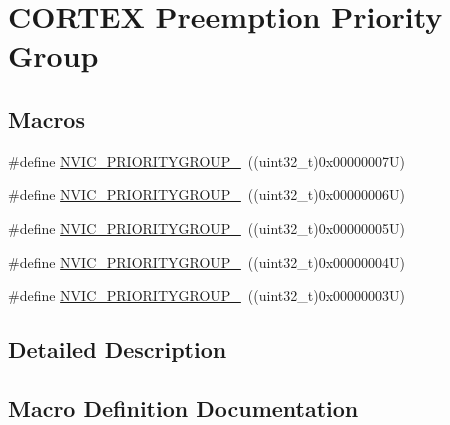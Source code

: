\hypertarget{group___c_o_r_t_e_x___preemption___priority___group}{}\section{C\+O\+R\+T\+EX Preemption Priority Group}
\label{group___c_o_r_t_e_x___preemption___priority___group}
\subsection*{Macros}
\begin{DoxyCompactItemize}
\item 
\#define \mbox{\hyperlink{group___c_o_r_t_e_x___preemption___priority___group_ga5e97dcff77680602c86e44f23f5ffa1a}{N\+V\+I\+C\+\_\+\+P\+R\+I\+O\+R\+I\+T\+Y\+G\+R\+O\+U\+P\+\_}}~((uint32\+\_\+t)0x00000007\+U)
\item 
\#define \mbox{\hyperlink{group___c_o_r_t_e_x___preemption___priority___group_ga702227137b010421c3a3b6434005a132}{N\+V\+I\+C\+\_\+\+P\+R\+I\+O\+R\+I\+T\+Y\+G\+R\+O\+U\+P\+\_}}~((uint32\+\_\+t)0x00000006\+U)
\item 
\#define \mbox{\hyperlink{group___c_o_r_t_e_x___preemption___priority___group_gaa43a3fd37850c120ce567ab2743d11b4}{N\+V\+I\+C\+\_\+\+P\+R\+I\+O\+R\+I\+T\+Y\+G\+R\+O\+U\+P\+\_}}~((uint32\+\_\+t)0x00000005\+U)
\item 
\#define \mbox{\hyperlink{group___c_o_r_t_e_x___preemption___priority___group_ga8ddb24962e6f0fc3273139d45d374b09}{N\+V\+I\+C\+\_\+\+P\+R\+I\+O\+R\+I\+T\+Y\+G\+R\+O\+U\+P\+\_}}~((uint32\+\_\+t)0x00000004\+U)
\item 
\#define \mbox{\hyperlink{group___c_o_r_t_e_x___preemption___priority___group_gae6eab9140204bc938255aa148e597c45}{N\+V\+I\+C\+\_\+\+P\+R\+I\+O\+R\+I\+T\+Y\+G\+R\+O\+U\+P\+\_}}~((uint32\+\_\+t)0x00000003\+U)
\end{DoxyCompactItemize}


\subsection{Detailed Description}


\subsection{Macro Definition Documentation}
\mbox{\label{group___c_o_r_t_e_x___preemption___priority___group_ga5e97dcff77680602c86e44f23f5ffa1a}} 
